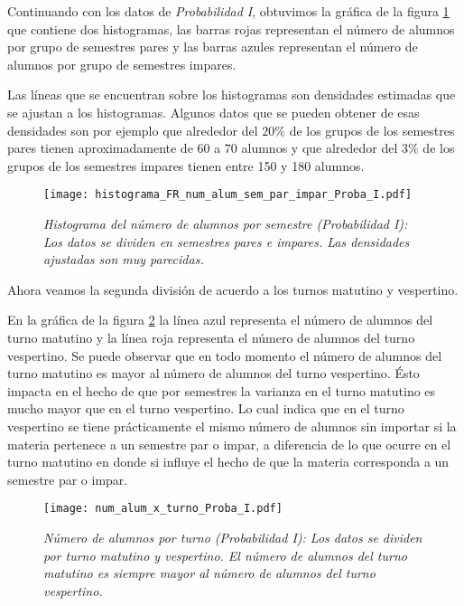 Continuando con los datos de \textit{Probabilidad I}, obtuvimos la gráfica de la figura \ref{HistAlumParImparProbaI} que contiene dos histogramas, las barras rojas representan el número de alumnos por grupo de semestres pares y las barras azules representan el número de alumnos por grupo de semestres impares.

Las líneas que se encuentran sobre los histogramas son densidades estimadas que se ajustan a los histogramas. Algunos datos que se pueden obtener de esas densidades son por ejemplo que alrededor del $20\%$ de los grupos de los semestres pares tienen aproximadamente de $60$ a $70$ alumnos y que alrededor del $3\%$ de los grupos de los semestres impares tienen entre 150 y 180 alumnos.

\begin{figure}[H]
\centering
\texttt{[image: histograma\_FR\_num\_alum\_sem\_par\_impar\_Proba\_I.pdf]} %
\caption[\textit{Histograma del número de alumnos por semestre: Probabilidad I}]{\textit{Histograma del número de alumnos por semestre (Probabilidad I): Los datos se dividen en semestres pares e impares. Las densidades ajustadas son muy parecidas.}}\label{HistAlumParImparProbaI}
\end{figure}


Ahora veamos la segunda división de acuerdo a los turnos matutino y vespertino.

En la gráfica de la figura \ref{num_alum_x_turno_Proba_I} la línea azul representa el número de alumnos del turno matutino y la línea roja representa el número de alumnos del turno vespertino. Se puede observar que en todo momento el número de alumnos del turno matutino es mayor al número de alumnos del turno vespertino. Ésto impacta en el hecho de que por semestres la varianza en el turno matutino es mucho mayor que en el turno vespertino. Lo cual indica que en el turno vespertino se tiene prácticamente el mismo número de alumnos sin importar si la materia pertenece a un semestre par o impar, a diferencia de lo que ocurre en el turno matutino en donde si influye el hecho de que la materia corresponda a un semestre par o impar.


\begin{figure}[H]
\centering
\texttt{[image: num\_alum\_x\_turno\_Proba\_I.pdf]} %
\caption[\textit{Número de alumnos por turno: Probabilidad I}]{\textit{Número de alumnos por turno (Probabilidad I): Los datos se dividen por turno matutino y vespertino. El número de alumnos del turno matutino es siempre mayor al número de alumnos del turno vespertino.}}\label{num_alum_x_turno_Proba_I}
\end{figure}

